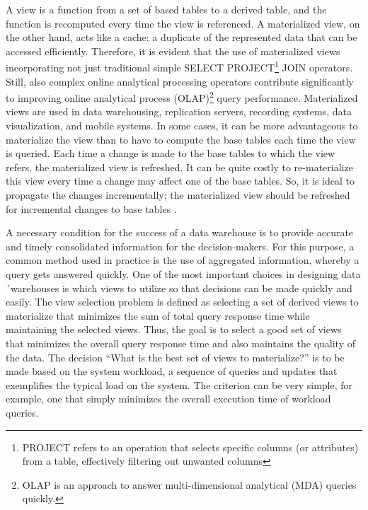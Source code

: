 A view is a function from a set of based tables to a derived table, and the function is recomputed every time the view is referenced. A materialized view, on the other hand, acts like a cache: a duplicate of the represented data that can be accessed efficiently. Therefore, it is evident that the use of materialized views incorporating not just traditional simple SELECT PROJECT\footnote{PROJECT refers to an operation that selects specific columns (or attributes) from a table, effectively filtering out unwanted columns} JOIN operators. Still, also complex online analytical processing operators contribute significantly to improving online analytical process (OLAP)\footnote{OLAP is an approach to answer multi-dimensional analytical (MDA) queries quickly.} query performance. Materialized views are used in data warehousing, replication servers, recording systems, data visualization, and mobile systems. In some cases, it can be more advantageous to materialize the view than to have to compute the base tables each time the view is queried. Each time a change is made to the base tables to which the view refers, the materialized view is refreshed. It can be quite costly to re-materialize this view every time a change may affect one of the base tables. So, it is ideal to propagate the changes incrementally; the materialized view should be refreshed for incremental changes to base tables \cite{Data_warehousing,efficient_incremental,rashid2009role}.\vspace{.3cm}

A necessary condition for the success of a data warehouse is to provide accurate and timely consolidated information for the decision-makers. For this purpose, a common method used in practice is the use of aggregated information, whereby a query gets answered quickly. One of the most important choices in designing data ´warehouses is which views to utilize so that decisions can be made quickly and easily. The view selection problem is defined as selecting a set of derived views to materialize that minimizes the sum of total query response time while maintaining the selected views. Thus, the goal is to select a good set of views that minimizes the overall query response time and also maintains the quality of the data. The decision ``What is the best set of views to materialize?'' is to be made based on the system workload, a sequence of queries and updates that exemplifies the typical load on the system. The criterion can be very simple, for example, one that simply minimizes the overall execution time of workload queries\cite{Academia-Juan-ale-2014,Kardel_Thakare}.\vspace{.3cm}

